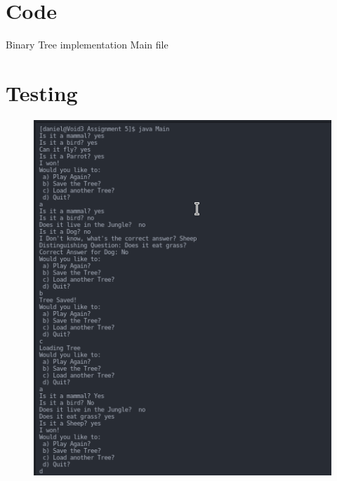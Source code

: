 \documentclass{article}
\begin{document}
	\section{Code}
	Binary Tree implementation
	Main file
	\section{Testing}
	\begin{figure}[h!]
	\centering
	\includegraphics{test1}
	\end{figure}
	
	
\end{document}
